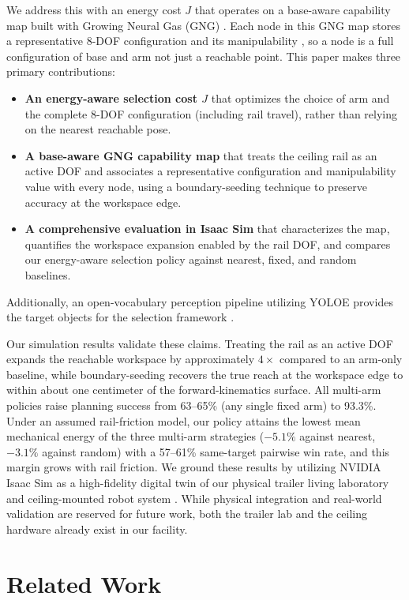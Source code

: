 \documentclass[conference]{IEEEtran}
\begin{document}
We address this with an energy cost $J$ that operates on a base-aware
capability map built with Growing Neural Gas (GNG) \cite{Fritzke1995}. Each node in this GNG map
stores a representative 8-DOF configuration and its manipulability
\cite{Yoshikawa1985}, so a node is a full configuration of base and arm
not just a reachable point. This paper makes three primary contributions:
\begin{itemize}
    \item \textbf{An energy-aware selection cost $J$} that optimizes the choice of arm and the complete 8-DOF configuration (including rail travel), rather than relying on the nearest reachable pose.
    \item \textbf{A base-aware GNG capability map} that treats the ceiling rail as an active DOF and associates a representative configuration and manipulability value with every node, using a boundary-seeding technique to preserve accuracy at the workspace edge.
    \item \textbf{A comprehensive evaluation in Isaac Sim} that characterizes the map, quantifies the workspace expansion enabled by the rail DOF, and compares our energy-aware selection policy against nearest, fixed, and random baselines.
\end{itemize}
Additionally, an open-vocabulary perception pipeline utilizing YOLOE provides the target objects for the selection framework \cite{Wang2025}.

Our simulation results validate these claims. Treating the rail as an active DOF 
expands the reachable workspace by approximately $4\times$ compared to an arm-only 
baseline, while boundary-seeding recovers the true reach at the workspace edge to 
within about one centimeter of the forward-kinematics surface. All multi-arm policies
raise planning success from 63--65\% (any single fixed arm) to 93.3\%. Under an
assumed rail-friction model, our policy attains the lowest mean mechanical energy of
the three multi-arm strategies ($-5.1\%$ against nearest, $-3.1\%$ against random)
with a 57--61\% same-target pairwise win rate, and this margin grows with rail friction.
We ground these results by utilizing NVIDIA Isaac Sim \cite{IsaacSim2026} as a 
high-fidelity digital twin of our physical trailer living laboratory and ceiling-mounted 
robot system \cite{Kubota2022}. While physical integration and real-world validation 
are reserved for future work, both the trailer lab and the ceiling hardware already 
exist in our facility.

\section{Related Work}
\end{document}
